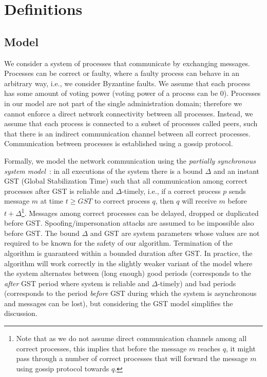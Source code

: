 \section{Definitions}
\label{sec:definitions}

\subsection{Model}

We consider a system of processes that communicate by exchanging messages.
Processes can be correct or faulty, where a faulty process can behave in an arbitrary way,
 i.e., we consider Byzantine faults. We assume that each process has some amount of voting power (voting power of a process can be $0$).
Processes in our model are not part of the single administration domain; therefore we cannot enforce a direct network connectivity between all processes. Instead, we assume that each process is connected to a subset of processes called peers, 
such that there is an indirect communication channel between all correct processes. Communication between processes is established using a gossip protocol.

Formally, we model the network communication using the \emph{partially synchronous system model}~\cite{DLS88:jacm}: in all executions
of the system there is a bound $\Delta$ and an instant GST (Global Stabilization Time) such that all communication among correct processes 
after GST is reliable and $\Delta$-timely, i.e., if a correct process $p$ sends message $m$ at time $t \ge GST$ to correct process $q$, then $q$ will receive $m$ before $t + \Delta$\footnote{Note that as we do not assume direct communication channels among all correct processes, this implies that before the message $m$ reaches $q$, it might pass through a number of 
	correct processes that will forward the message $m$ using gossip protocol towards $q$.}. Messages among correct processes can be delayed, dropped or duplicated before GST. Spoofing/impersonation attacks are assumed to be impossible also before GST. 
The bound $\Delta$ and GST are system parameters whose values are not required to be known for the safety of our algorithm. Termination of the algorithm is guaranteed within a bounded duration after GST.
In practice, the algorithm will work correctly in the slightly weaker variant of the model where the system alternates between (long enough) good periods (corresponds to the \emph{after} GST period where system is reliable and $\Delta$-timely) and bad periods (corresponds to the period \emph{before} GST during which the system is asynchronous and messages can be lost), but considering the GST model simplifies the discussion.  

